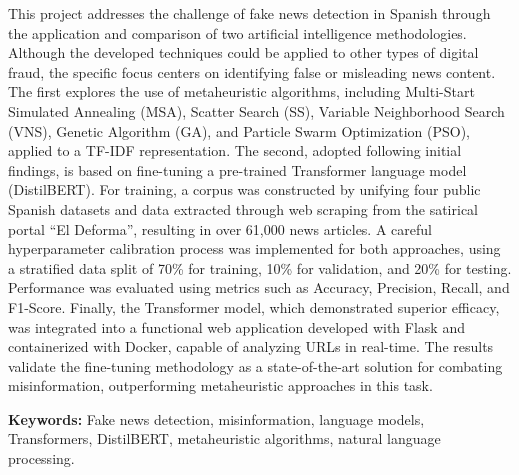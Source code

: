 This project addresses the challenge of fake news detection in Spanish through the application and comparison of two artificial intelligence methodologies. Although the developed techniques could be applied to other types of digital fraud, the specific focus centers on identifying false or misleading news content. The first explores the use of metaheuristic algorithms, including Multi-Start Simulated Annealing (MSA), Scatter Search (SS), Variable Neighborhood Search (VNS), Genetic Algorithm (GA), and Particle Swarm Optimization (PSO), applied to a TF-IDF representation. The second, adopted following initial findings, is based on fine-tuning a pre-trained Transformer language model (DistilBERT). For training, a corpus was constructed by unifying four public Spanish datasets and data extracted through web scraping from the satirical portal ``El Deforma'', resulting in over 61,000 news articles. A careful hyperparameter calibration process was implemented for both approaches, using a stratified data split of 70\% for training, 10\% for validation, and 20\% for testing. Performance was evaluated using metrics such as Accuracy, Precision, Recall, and F1-Score. Finally, the Transformer model, which demonstrated superior efficacy, was integrated into a functional web application developed with Flask and containerized with Docker, capable of analyzing URLs in real-time. The results validate the fine-tuning methodology as a state-of-the-art solution for combating misinformation, outperforming metaheuristic approaches in this task.

\vspace{0.9cm}
\textbf{Keywords:} Fake news detection, misinformation, language models, Transformers, DistilBERT, metaheuristic algorithms, natural language processing.